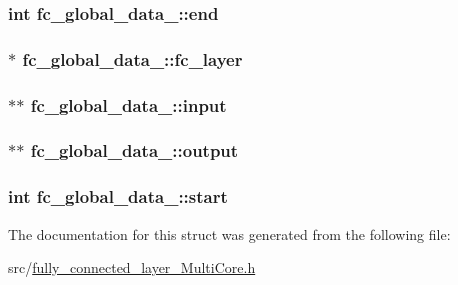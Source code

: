 \subsubsection[{end}]{\setlength{\rightskip}{0pt plus 5cm}int fc\+\_\+global\+\_\+data\+\_\+\+::end}\hypertarget{structfc__global__data___a5924178156d04cd1c7c79ca5ce07e653}{}\label{structfc__global__data___a5924178156d04cd1c7c79ca5ce07e653}
\subsubsection[{fc\+\_\+layer}]{$\ast$ fc\+\_\+global\+\_\+data\+\_\+\+::fc\+\_\+layer}\hypertarget{structfc__global__data___acc7f1357fa20bbbf814f38cf3cb9f106}{}\label{structfc__global__data___acc7f1357fa20bbbf814f38cf3cb9f106}
\subsubsection[{input}]{$\ast$$\ast$ fc\+\_\+global\+\_\+data\+\_\+\+::input}\hypertarget{structfc__global__data___a4407f1e83b72f8846d23aa2e1bfca7e7}{}\label{structfc__global__data___a4407f1e83b72f8846d23aa2e1bfca7e7}
\subsubsection[{output}]{$\ast$$\ast$ fc\+\_\+global\+\_\+data\+\_\+\+::output}\hypertarget{structfc__global__data___acc58974b2b758390a192abdb06a8a615}{}\label{structfc__global__data___acc58974b2b758390a192abdb06a8a615}
\subsubsection[{start}]{\setlength{\rightskip}{0pt plus 5cm}int fc\+\_\+global\+\_\+data\+\_\+\+::start}\hypertarget{structfc__global__data___a5d019756d3bb4fb37e2a125f1f3b551b}{}\label{structfc__global__data___a5d019756d3bb4fb37e2a125f1f3b551b}


The documentation for this struct was generated from the following file\+:\begin{DoxyCompactItemize}
\item 
src/\hyperlink{fully__connected__layer__MultiCore_8h}{fully\+\_\+connected\+\_\+layer\+\_\+\+Multi\+Core.\+h}\end{DoxyCompactItemize}

